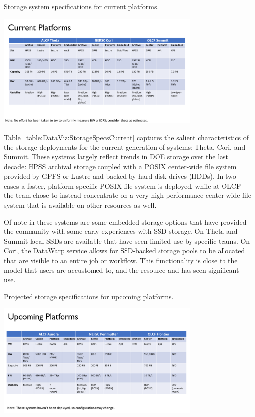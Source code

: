 %
%
\begin{table}[t]
	\vspace{-2mm}
	\centering
	\caption{\label{table:DataViz:StorageSpecsCurrent} Storage system specifications for current platforms.}
	\includegraphics[width=0.75\textwidth]{projects/2.3.4-DataViz/DataViz-storage-specs-current.pdf}
\end{table}

Table~\ref{table:DataViz:StorageSpecsCurrent} captures the salient
characteristics of the storage deployments for the current generation of
systems: Theta, Cori, and Summit. These systems largely reflect trends in DOE
storage over the last decade: HPSS archival storage coupled with a POSIX
center-wide file system provided by GPFS or Lustre and backed by hard disk
drives (HDDs). In two cases a faster, platform-specific POSIX file system is 
deployed, while at OLCF the team chose to instead concentrate on a very high
performance center-wide file system that is available on other resources as well.

Of note in these systems are some embedded storage options that have
provided the community with some early experiences with SSD storage. On
Theta and Summit local SSDs are available that have seen limited use
by specific teams. On Cori, the DataWarp service allows for SSD-backed
storage pools to be allocated that are visible to an entire job or
workflow. This functionality is close to the model that users are
accustomed to, and the resource and has seen significant use.

%
%
\begin{table}[t]
	\vspace{-2mm}
	\centering
	\caption{\label{table:DataViz:StorageSpecsNext} Projected storage specifications for upcoming platforms.}
	\includegraphics[width=0.75\textwidth]{projects/2.3.4-DataViz/DataViz-storage-specs-next.pdf}
\end{table}

